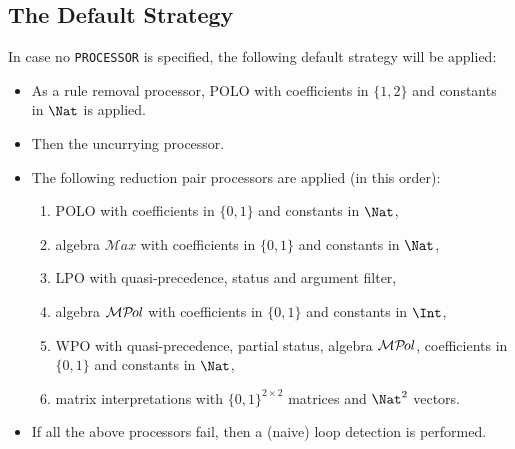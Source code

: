 \documentclass{llncs}
\def\Amax{{\mathcal{M}ax}}
\def\Apol{{\mathcal{P}\kern-.1emol}}
\def\Amp{{\mathcal{M}\Apol}}
\begin{document}
\subsection{The Default Strategy}
\label{sec:default}
In case no \texttt{PROCESSOR} is specified,
the following default strategy will be applied:
\begin{itemize}
\item
	As a rule removal processor,
	POLO with coefficients in $\{1,2\}$ and constants in $\Nat$ is applied.
\item
	Then the uncurrying processor.
\item
	The following reduction pair processors are applied (in this order):
	\smallskip
	\begin{enumerate}
	\item POLO with coefficients in $\{0,1\}$ and constants in $\Nat$,
	\item algebra $\Amax$ with coefficients in $\{0,1\}$ and constants in $\Nat$,
	\item LPO with quasi-precedence,
		status and argument filter,
	\item algebra $\Amp$ with coefficients in $\{0,1\}$ and constants in $\Int$,
	\item WPO with
		quasi-precedence, partial status,
		algebra $\Amp$, coefficients in $\{0,1\}$ and constants in $\Nat$,
	\item matrix interpretations
		with $\{0,1\}^{2\times2}$ matrices and $\Nat^2$ vectors.
	\end{enumerate}
	\smallskip
\item
	If all the above processors fail, then a (naive) loop detection is performed.
\end{itemize}
\end{document}

